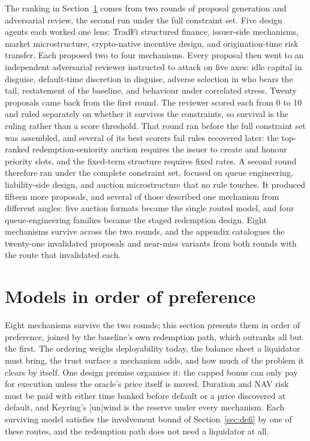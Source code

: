 \documentclass[11pt,a4paper]{article}
\begin{document}
The ranking in Section~\ref{sec:models} comes from two rounds of proposal generation and adversarial review, the second run under the full constraint set. Five design agents each worked one lens: TradFi structured finance, issuer-side mechanisms, market microstructure, crypto-native incentive design, and origination-time risk transfer. Each proposed two to four mechanisms. Every proposal then went to an independent adversarial reviewer instructed to attack on five axes: idle capital in disguise, default-time discretion in disguise, adverse selection in who bears the tail, restatement of the baseline, and behaviour under correlated stress. Twenty proposals came back from the first round. The reviewer scored each from 0 to 10 and ruled separately on whether it survives the constraints, so survival is the ruling rather than a score threshold. That round ran before the full constraint set was assembled, and several of its best scorers fail rules recovered later: the top-ranked redemption-seniority auction requires the issuer to create and honour priority slots, and the fixed-term structure requires fixed rates. A second round therefore ran under the complete constraint set, focused on queue engineering, liability-side design, and auction microstructure that no rule touches. It produced fifteen more proposals, and several of those described one mechanism from different angles: five auction formats became the single routed model, and four queue-engineering families became the staged redemption design. Eight mechanisms survive across the two rounds, and the appendix catalogues the twenty-one invalidated proposals and near-miss variants from both rounds with the route that invalidated each.

\section{Models in order of preference}\label{sec:models}

Eight mechanisms survive the two rounds; this section presents them in order of preference, joined by the baseline's own redemption path, which outranks all but the first. The ordering weighs deployability today, the balance sheet a liquidator must bring, the trust surface a mechanism adds, and how much of the problem it clears by itself. One design premise organises it: the capped bonus can only pay for execution unless the oracle's price itself is moved. Duration and NAV risk must be paid with either time banked before default or a price discovered at default, and Keyring's [un]wind is the reserve under every mechanism. Each surviving model satisfies the involvement bound of Section~\ref{sec:defi} by one of these routes, and the redemption path does not need a liquidator at all.
\end{document}
